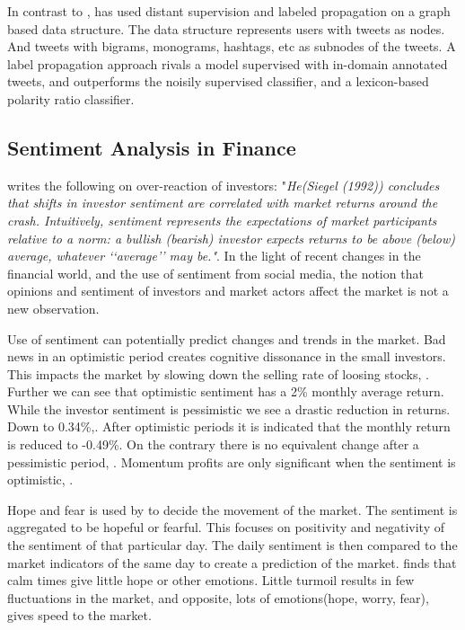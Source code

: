 In contrast to \cite[]{becker13}, \cite[]{sperious11} has used distant
supervision and labeled propagation on a graph based data structure. The data
structure represents users with tweets as nodes. And tweets with bigrams,
monograms, hashtags, etc as subnodes of the tweets. A label propagation approach
rivals a model supervised with in-domain annotated tweets, and outperforms the
noisily supervised classifier, and a lexicon-based polarity ratio classifier.
\cite[]{sperious11} 

\subsection{Sentiment Analysis in Finance}
\cite[p2]{Brown20041} writes the following on over-reaction of investors: 
"\textit{He(Siegel (1992)) concludes that shifts in investor sentiment are correlated
with market returns around the crash. Intuitively, sentiment represents the
expectations of market participants relative to a norm: a bullish (bearish)
investor expects returns to be above (below) average, whatever ‘‘average’’ may
be."}. 
In the light of recent changes in the financial world, and the use
of sentiment from social media, the notion that opinions and sentiment of
investors and market actors affect the market is not a new observation.

Use of sentiment can potentially predict changes and trends in the market.
Bad news in an optimistic period creates cognitive dissonance in the small
investors. This impacts the market by slowing down the selling rate of loosing
stocks, \cite[p29]{doukas10:sentiment_and_momentum}.
Further we can see that optimistic sentiment has a 2\% monthly average return.
While the investor sentiment is pessimistic we see a drastic reduction in
returns. Down to 0.34\%,\cite[p5]{doukas10:sentiment_and_momentum}.
After optimistic periods it is indicated that the monthly return is reduced to
-0.49\%. On the contrary there is no equivalent change after a pessimistic
period, \cite[p6-7]{doukas10:sentiment_and_momentum}.
Momentum profits are only significant when the sentiment is optimistic,
\cite[p29]{doukas10:sentiment_and_momentum}.

Hope and fear is used by \cite[]{Zhang201155} to decide the movement of the
market. The sentiment is aggregated to be hopeful or fearful. This 
focuses on positivity and negativity of the sentiment of that particular day.
The daily sentiment is then compared to the market indicators of the same day
to create a prediction of the market. \cite[]{Zhang201155} finds that calm
times give little hope or other emotions. Little turmoil results in few
fluctuations in the market, and opposite, lots of emotions(hope, worry, fear),
gives speed to the market.


